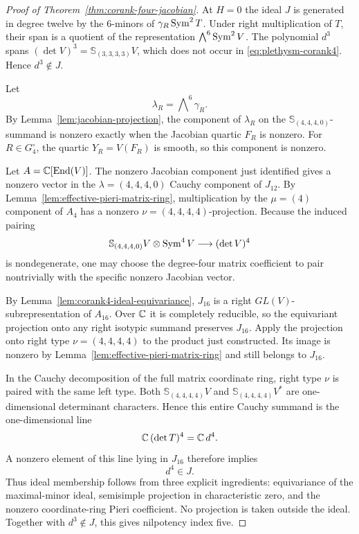 \begin{proof}[Proof of Theorem~\ref{thm:corank-four-jacobian}]
At \(H=0\) the ideal \(J\) is generated in degree twelve by the
\(6\)-minors of \(\gamma_R\operatorname{Sym}^2T\).  Under right multiplication of
\(T\), their span is a quotient of the representation
\(\bigwedge^6\operatorname{Sym}^2V\).  The polynomial \(d^3\) spans
\((\det V)^3=\mathbb S_{(3,3,3,3)}V\), which does not occur in
\eqref{eq:plethysm-corank4}.  Hence \(d^3\notin J\).

Let
\[
 \lambda_R=\bigwedge\nolimits^6\gamma_R.
\]
By Lemma~\ref{lem:jacobian-projection}, the component of
\(\lambda_R\) on the
\(\mathbb S_{(4,4,4,0)}\)-summand is nonzero exactly when the
Jacobian quartic \(F_R\) is nonzero.  For \(R\in G_4^\circ\), the
quartic \(Y_R=V(F_R)\) is smooth, so this component is nonzero.

Let \(A=\mathbb C[\operatorname{End}(V)]\).  The nonzero Jacobian component just
identified gives a nonzero vector in the
\(\lambda=(4,4,4,0)\) Cauchy component of \(J_{12}\).
By Lemma~\ref{lem:effective-pieri-matrix-ring}, multiplication by
the \(\mu=(4)\) component of \(A_4\) has a nonzero
\(\nu=(4,4,4,4)\)-projection.  Because the induced pairing
\[
 \mathbb S_{(4,4,4,0)}V\otimes\operatorname{Sym}^4V
 \longrightarrow(\det V)^4
\]
is nondegenerate, one may choose the degree-four matrix coefficient
to pair nontrivially with the specific nonzero Jacobian vector.

By Lemma~\ref{lem:corank4-ideal-equivariance}, \(J_{16}\) is a
right \(GL(V)\)-subrepresentation of \(A_{16}\).  Over \(\mathbb C\) it is
completely reducible, so the equivariant projection onto any right
isotypic summand preserves \(J_{16}\).  Apply the projection onto
right type \(\nu=(4,4,4,4)\) to the product just constructed.  Its
image is nonzero by Lemma~\ref{lem:effective-pieri-matrix-ring} and
still belongs to \(J_{16}\).

In the Cauchy decomposition of the full matrix coordinate ring, right
type \(\nu\) is paired with the same left type.  Both
\(\mathbb S_{(4,4,4,4)}V\) and
\(\mathbb S_{(4,4,4,4)}V^*\) are one-dimensional determinant
characters.  Hence this entire Cauchy summand is the one-dimensional
line
\[
 \mathbb C\,(\det T)^4=\mathbb C\,d^4.
\]
A nonzero element of this line lying in \(J_{16}\) therefore implies
\[
 d^4\in J.
\]
Thus ideal membership follows from three explicit ingredients:
equivariance of the maximal-minor ideal, semisimple projection in
characteristic zero, and the nonzero coordinate-ring Pieri
coefficient.  No projection is taken outside the ideal.  Together with \(d^3\notin J\), this
gives nilpotency index five.
\end{proof}

